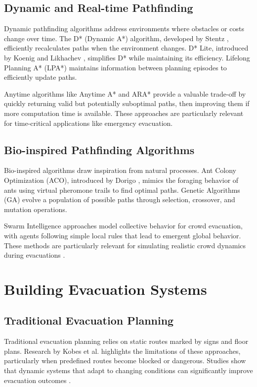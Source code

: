 \documentclass[11pt,a4paper]{report}
\begin{document}
\subsection{Dynamic and Real-time Pathfinding}
Dynamic pathfinding algorithms address environments where obstacles or costs change over time. The D* (Dynamic A*) algorithm, developed by Stentz \cite{stentz1994optimal}, efficiently recalculates paths when the environment changes. D* Lite, introduced by Koenig and Likhachev \cite{koenig2002d}, simplifies D* while maintaining its efficiency. Lifelong Planning A* (LPA*) \cite{koenig2004lifelong} maintains information between planning episodes to efficiently update paths.

Anytime algorithms like Anytime A* and ARA* \cite{likhachev2003ara} provide a valuable trade-off by quickly returning valid but potentially suboptimal paths, then improving them if more computation time is available. These approaches are particularly relevant for time-critical applications like emergency evacuation.

\subsection{Bio-inspired Pathfinding Algorithms}
Bio-inspired algorithms draw inspiration from natural processes. Ant Colony Optimization (ACO), introduced by Dorigo \cite{dorigo1996ant}, mimics the foraging behavior of ants using virtual pheromone trails to find optimal paths. Genetic Algorithms (GA) \cite{holland1992adaptation} evolve a population of possible paths through selection, crossover, and mutation operations.

Swarm Intelligence approaches model collective behavior for crowd evacuation, with agents following simple local rules that lead to emergent global behavior. These methods are particularly relevant for simulating realistic crowd dynamics during evacuations \cite{helbing1995social}.

\section{Building Evacuation Systems}

\subsection{Traditional Evacuation Planning}
Traditional evacuation planning relies on static routes marked by signs and floor plans. Research by Kobes et al. \cite{kobes2010building} highlights the limitations of these approaches, particularly when predefined routes become blocked or dangerous. Studies show that dynamic systems that adapt to changing conditions can significantly improve evacuation outcomes \cite{kuligowski2005review}.
\end{document}
